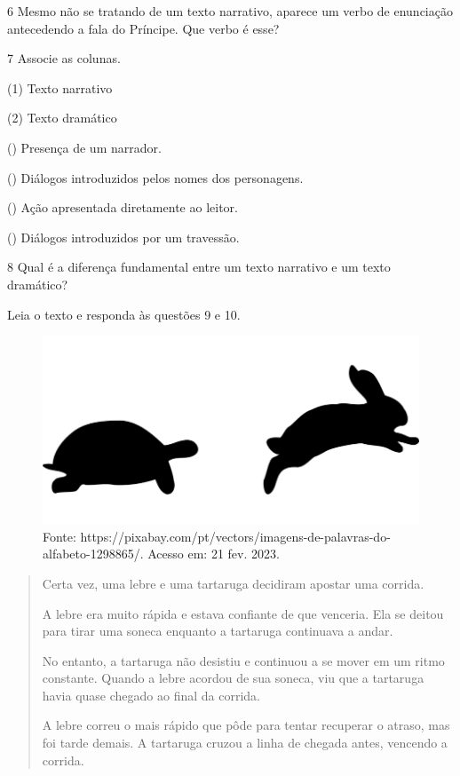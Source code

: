 
\num{6} Mesmo não se tratando de um texto narrativo, aparece um verbo de enunciação antecedendo a fala do Príncipe. Que verbo é esse?


\num{7} Associe as colunas.

\begin{multicols}{2}
(1) Texto narrativo\medskip

(2) Texto dramático

\columnbreak

() Presença de um narrador.

() Diálogos introduzidos pelos nomes dos personagens.

() Ação apresentada diretamente ao leitor.

() Diálogos introduzidos por um travessão.
\end{multicols}

\num{8} Qual é a diferença fundamental entre um texto narrativo e um texto dramático?



Leia o texto e responda às questões 9 e 10.

\begin{figure}[htpb!]
\includegraphics[width=.5\textwidth]{./imgs/img6.png}
\caption{Fonte: https://pixabay.com/pt/vectors/imagens-de-palavras-do-alfabeto-1298865/. Acesso em: 21 fev. 2023.}
\end{figure}

\begin{quote}
Certa vez, uma lebre e uma tartaruga decidiram apostar uma corrida.

A lebre era muito rápida e estava confiante de que venceria. Ela se
deitou para tirar uma soneca enquanto a tartaruga continuava a andar.

No entanto, a tartaruga não desistiu e continuou a se mover em um ritmo
constante. Quando a lebre acordou de sua soneca, viu que a tartaruga
havia quase chegado ao final da corrida.

A lebre correu o mais rápido que pôde para tentar recuperar o atraso,
mas foi tarde demais. A tartaruga cruzou a linha de chegada antes,
vencendo a corrida.
\end{quote}

